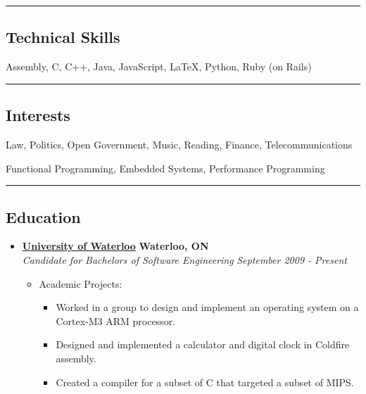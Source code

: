 \documentclass[10pt,letterpaper]{article}
\begin{document}
\hrule
\vspace{-0.4em}
\subsection*{Technical Skills}
\begin{description}[labelindent=\parindent]
  \item[Languages:]
  Assembly, C, C++, Java, JavaScript, \LaTeX, Python, Ruby (on Rails)
\end{description}

\hrule
\vspace{-0.4em}
\subsection*{Interests}
\begin{description}[labelindent=\parindent]
  \item[Personal:]
  Law, Politics, Open Government, Music, Reading, Finance, Telecommunications
  \item[Technical:]
  Functional Programming, Embedded Systems, Performance Programming
\end{description}

\hrule
\vspace{-0.4em}
\subsection*{Education}
  \begin{itemize}
    \parskip=-0.1em

    \item[]
    {\href{http://www.uwaterloo.ca}{\textbf{University of Waterloo}} \hfill
      \textbf{Waterloo, ON}}
    \\
    {\emph{Candidate for Bachelors of Software Engineering} \hfill
      \emph{September 2009 - Present}}

    \begin{itemize}[label=\textbullet]
      \item Academic Projects:
      \begin{itemize}
        \itemsep0em
        \item Worked in a group to design and implement an operating system on
              a Cortex-M3 ARM processor.
        \item Designed and implemented a calculator and digital clock in Coldfire
              assembly.
        \item Created a compiler for a subset of C that targeted a subset of
              MIPS.
      \end{itemize}
    \end{itemize}
  \end{itemize}
\end{document}
